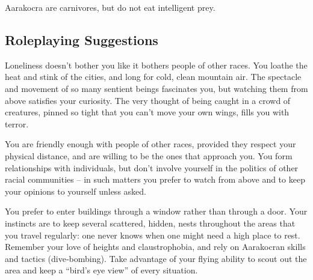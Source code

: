 \documentclass[10pt,a4paper,twocolumn]{d20}
\begin{document}
Aarakocra are carnivores, but do not eat intelligent prey.
\subsection{Roleplaying Suggestions}
Loneliness doesn’t bother you like it bothers people of other races. You loathe the heat and stink of the cities, and long for cold, clean mountain air. The spectacle and movement of so many sentient beings fascinates you, but watching them from above satisfies your curiosity. The very thought of being caught in a crowd of creatures, pinned so tight that you can’t move your own wings, fills you with terror.

You are friendly enough with people of other races, provided they respect your physical distance, and are willing to be the ones that approach you. You form relationships with individuals, but don’t involve yourself in the politics of other racial communities – in such matters you prefer to watch from above and to keep your opinions to yourself unless asked.

You prefer to enter buildings through a window rather than through a door. Your instincts are to keep several scattered, hidden, nests throughout the areas that you travel regularly: one never knows when one might need a high place to rest. Remember your love of heights and claustrophobia, and rely on Aarakocran skills and tactics (dive‐bombing). Take advantage of your flying ability to scout out the area and keep a ``bird’s eye view'' of every situation.
\end{document}
